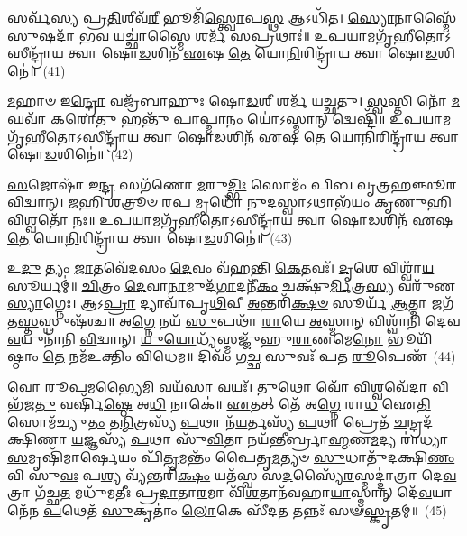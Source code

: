 {\anuvakamend[{𑌅𑌸𑌾᳴𑌵𑌿 \ul{𑌸}\-𑌪𑍍𑌤𑌵𑌿𑍞᳴𑌶𑌤𑌿𑌃}]}%

𑌸𑌰𑍍𑌵᳴𑌸𑍍𑌯 𑌪𑍍𑌰\-\ul{𑌤𑌿}\-𑌶𑍀𑌵᳴\-\ul{𑌰𑍀} 𑌭𑍂𑌮𑌿᳴\-\ul{𑌸𑍍𑌤𑍍𑌵𑍋}\-𑌪\-\ul{𑌸𑍍𑌥} 𑌆\-𑌽𑌧𑌿᳴𑌤। \ul{𑌸𑍍𑌯𑍋}\-𑌨𑌾𑌸𑍍𑌮𑍈᳴ \ul{𑌸𑍁}\-𑌷𑌦𑌾᳴ 𑌭\-\ul{𑌵} 𑌯𑌚𑍍𑌛𑌾॑\-\ul{𑌸𑍍𑌮𑍈} 𑌶𑌰𑍍𑌮᳴ \ul{𑌸}\-𑌪𑍍𑌰𑌥𑌾𑌃॑॥ \ul{𑌉}\-\-\ul{𑌪}\-\-\ul{𑌯𑌾}\-𑌮𑌗𑍃᳴𑌹𑍀\-\ul{𑌤𑍋}\-\-𑌽𑌸𑍀𑌨𑍍𑌦𑍍𑌰𑌾᳴𑌯 𑌤𑍍𑌵𑌾 𑌷𑍋\-\ul{𑌡}\-𑌶𑌿𑌨᳴ \ul{𑌏}\-𑌷 \ul{𑌤𑍇} 𑌯𑍋\-\ul{𑌨𑌿}\-𑌰𑌿𑌨𑍍𑌦𑍍𑌰𑌾᳴𑌯 𑌤𑍍𑌵𑌾 𑌷𑍋\-\ul{𑌡}\-𑌶𑌿𑌨𑍇॑॥~(41)

{\anuvakamend[{𑌸𑌰𑍍𑌵᳴\-\ul{𑌸𑍍𑌯} 𑌷𑌡𑍍𑌵𑌿𑍞᳴𑌶𑌤𑌿𑌃}]}%

\-\ul{𑌮}\-𑌹𑌾𑍞 𑌇\-\ul{𑌨𑍍𑌦𑍍𑌰𑍋} 𑌵𑌜𑍍𑌰᳴𑌬𑌾𑌹𑍁𑌃 𑌷𑍋\-\ul{𑌡}\-𑌶𑍀 𑌶𑌰𑍍𑌮᳴ 𑌯𑌚𑍍𑌛𑌤𑍁। \ul{𑌸𑍍𑌵}\-𑌸𑍍𑌤𑌿 𑌨𑍋᳴ \ul{𑌮}\-𑌘𑌵𑌾᳴ 𑌕𑌰𑍋\-\ul{𑌤𑍁} 𑌹𑌨𑍍𑌤𑍁᳴ \ul{𑌪𑌾}\-𑌪𑍍𑌮𑌾\-\ul{𑌨𑌂} 𑌯𑍋॑\-𑌽𑌸𑍍𑌮𑌾𑌨𑍍 𑌦𑍍𑌵𑍇𑌷𑍍𑌟𑌿᳴॥ \ul{𑌉}\-\-\ul{𑌪}\-\-\ul{𑌯𑌾}\-𑌮𑌗𑍃᳴𑌹𑍀\-\ul{𑌤𑍋}\-\-𑌽𑌸𑍀𑌨𑍍𑌦𑍍𑌰𑌾᳴𑌯 𑌤𑍍𑌵𑌾 𑌷𑍋\-\ul{𑌡}\-𑌶𑌿𑌨᳴ \ul{𑌏}\-𑌷 \ul{𑌤𑍇} 𑌯𑍋\-\ul{𑌨𑌿}\-𑌰𑌿𑌨𑍍𑌦𑍍𑌰𑌾᳴𑌯 𑌤𑍍𑌵𑌾 𑌷𑍋\-\ul{𑌡}\-𑌶𑌿𑌨𑍇॑॥~(42)

{\anuvakamend[{𑌸𑌰𑍍𑌵᳴𑌸𑍍𑌯 \ul{𑌮}\-𑌹𑌾𑌨𑍍𑌥𑍍𑌷𑌡𑍍𑌵𑌿𑍞᳴𑌶\-\ul{𑌤𑌿𑌃} 𑌷𑌡𑍍𑌵𑌿𑍞᳴𑌶𑌤𑌿𑌃}]}%

\-\ul{𑌸}\-𑌜𑍋𑌷𑌾᳴ 𑌇\-\ul{𑌨𑍍𑌦𑍍𑌰} 𑌸𑌗᳴𑌣𑍋 \ul{𑌮}\-𑌰𑍁\-\ul{𑌦𑍍𑌭𑌿𑌃} 𑌸𑍋𑌮𑌂᳴ 𑌪𑌿𑌬 𑌵𑍃𑌤𑍍𑌰𑌹𑌞𑍍𑌛𑍂𑌰 \ul{𑌵𑌿}\-𑌦𑍍𑌵𑌾𑌨𑍍। \ul{𑌜}\-𑌹𑌿 𑌶\-\ul{𑌤𑍍𑌰𑍂}\-\-\ul{𑍞} 𑌰\-\ul{𑌪} 𑌮𑍃𑌧𑍋᳴ 𑌨𑍁\-\ul{𑌦}\-𑌸𑍍𑌵𑌾\-𑌽𑌥𑌾𑌭᳴𑌯𑌂 𑌕𑍃𑌣𑍁𑌹𑌿 \ul{𑌵𑌿}\-𑌶𑍍𑌵𑌤𑍋᳴ 𑌨𑌃॥ \ul{𑌉}\-\-\ul{𑌪}\-\-\ul{𑌯𑌾}\-𑌮𑌗𑍃᳴𑌹𑍀\-\ul{𑌤𑍋}\-\-𑌽𑌸𑍀𑌨𑍍𑌦𑍍𑌰𑌾᳴𑌯 𑌤𑍍𑌵𑌾 𑌷𑍋\-\ul{𑌡}\-𑌶𑌿𑌨᳴ \ul{𑌏}\-𑌷 \ul{𑌤𑍇} 𑌯𑍋\-\ul{𑌨𑌿}\-𑌰𑌿𑌨𑍍𑌦𑍍𑌰𑌾᳴𑌯 𑌤𑍍𑌵𑌾 𑌷𑍋\-\ul{𑌡}\-𑌶𑌿𑌨𑍇॑॥~(43)

{\anuvakamend[{\-\ul{𑌸}\-𑌜𑍋𑌷𑌾॑\-\ul{𑌸𑍍𑌤𑍍𑌰𑌿}\-\-\ul{𑍞}\-𑌶𑌤𑍍}]}%

𑌉\-\ul{𑌦𑍁} 𑌤𑍍𑌯𑌂 \ul{𑌜𑌾}\-𑌤𑌵𑍇᳴𑌦𑌸𑌂 \ul{𑌦𑍇}\-𑌵𑌂 𑌵᳴𑌹𑌨𑍍𑌤𑌿 \ul{𑌕𑍇}\-𑌤𑌵𑌃᳴। \ul{𑌦𑍃}\-𑌶𑍇 𑌵𑌿𑌶𑍍𑌵𑌾᳴\-\ul{𑌯} 𑌸𑍂𑌰𑍍𑌯𑌮𑍍॑॥ \ul{𑌚𑌿}\-𑌤𑍍𑌰𑌂 \ul{𑌦𑍇}\-𑌵𑌾\-\ul{𑌨𑌾}\-𑌮𑍁𑌦᳴\-\ul{𑌗𑌾}\-𑌦𑌨𑍀᳴\-\ul{𑌕𑌂} 𑌚𑌕𑍍𑌷𑍁᳴\-\ul{𑌰𑍍𑌮𑌿}\-𑌤𑍍𑌰\-\ul{𑌸𑍍𑌯} 𑌵𑌰𑍁᳴𑌣\-\ul{𑌸𑍍𑌯𑌾}\-𑌗𑍍𑌨𑍇𑌃। 𑌆\-𑌽\-\ul{𑌪𑍍𑌰𑌾} 𑌦𑍍𑌯𑌾𑌵𑌾᳴𑌪𑍃\-\ul{𑌥𑌿}\-𑌵𑍀 \ul{𑌅}\-𑌨𑍍𑌤𑌰𑌿᳴\-\ul{𑌕𑍍𑌷}\-\-\ul{𑍞} 𑌸𑍂𑌰𑍍𑌯᳴ \ul{𑌆}\-𑌤𑍍𑌮𑌾 𑌜𑌗᳴𑌤\-\ul{𑌸𑍍𑌤}\-𑌸𑍍𑌥𑍁𑌷᳴𑌶𑍍𑌚॥ 𑌅\-\ul{𑌗𑍍𑌨𑍇} 𑌨𑌯᳴ \ul{𑌸𑍁}\-𑌪𑌥𑌾᳴ \ul{𑌰𑌾}\-𑌯𑍇 \ul{𑌅}\-𑌸𑍍𑌮𑌾𑌨𑍍 𑌵𑌿𑌶𑍍𑌵𑌾᳴𑌨𑌿 𑌦𑍇𑌵 \ul{𑌵}\-𑌯𑍁𑌨𑌾᳴𑌨𑌿 \ul{𑌵𑌿}\-𑌦𑍍𑌵𑌾𑌨𑍍। \ul{𑌯𑍁}\-\-\ul{𑌯𑍋}\-𑌧𑍍𑌯᳴𑌸𑍍𑌮𑌜𑍍𑌜𑍁᳴𑌹𑍁\-\ul{𑌰𑌾}\-𑌣𑌮𑍇\-\ul{𑌨𑍋} 𑌭𑍂𑌯𑌿᳴𑌷𑍍𑌠𑌾𑌂 \ul{𑌤𑍇} 𑌨𑌮᳴𑌉𑌕𑍍𑌤𑌿𑌂 𑌵𑌿𑌧𑍇𑌮॥ 𑌦𑌿𑌵𑌂᳴ 𑌗\-\ul{𑌚𑍍𑌛} 𑌸𑍁𑌵𑌃᳴ 𑌪𑌤 \ul{𑌰𑍂}\-𑌪𑍇𑌣᳴~(44)

𑌵𑍋 \ul{𑌰𑍂}\-𑌪\-\ul{𑌮}\-𑌭𑍍𑌯𑍈\-\ul{𑌮𑌿} 𑌵𑌯᳴\-\ul{𑌸𑌾} 𑌵𑌯𑌃᳴। \ul{𑌤𑍁}\-𑌥𑍋 𑌵𑍋᳴ \ul{𑌵𑌿}\-𑌶𑍍𑌵𑌵𑍇᳴\-\ul{𑌦𑌾} 𑌵𑌿 𑌭᳴𑌜\-\ul{𑌤𑍁} 𑌵𑌰𑍍\mbox{}𑌷𑌿᳴\-\ul{𑌷𑍍𑌠𑍇} 𑌅\-\ul{𑌧𑌿} 𑌨𑌾𑌕𑍇॑॥ \ul{𑌏}\-𑌤𑌤𑍍 𑌤𑍇᳴ 𑌅\-\ul{𑌗𑍍𑌨𑍇} 𑌰𑌾\-\ul{𑌧} 𑌐\-\ul{𑌤𑌿} 𑌸𑍋𑌮᳴𑌚𑍍𑌯𑍁\-\ul{𑌤𑌂} 𑌤\-\ul{𑌨𑍍𑌮𑌿}\-𑌤𑍍𑌰𑌸𑍍𑌯᳴ \ul{𑌪}\-𑌥𑌾 𑌨᳴\-\ul{𑌯}\-𑌰𑍍𑌤𑌸𑍍𑌯᳴ \ul{𑌪}\-𑌥𑌾 𑌪𑍍𑌰𑍇𑌤᳴ \ul{𑌚}\-𑌨𑍍𑌦𑍍𑌰𑌦᳴𑌕𑍍𑌷𑌿𑌣𑌾 \ul{𑌯}\-𑌜𑍍𑌞𑌸𑍍𑌯᳴ \ul{𑌪}\-𑌥𑌾 𑌸𑍁᳴\-\ul{𑌵𑌿}\-𑌤𑌾 𑌨𑌯᳴𑌨𑍍𑌤𑍀𑌰𑍍𑌬𑍍𑌰𑌾\-\ul{𑌹𑍍𑌮}\-𑌣\-\ul{𑌮}\-𑌦𑍍𑌯 𑌰𑌾॑𑌧𑍍𑌯𑌾\-\ul{𑌸}\-𑌮𑍃𑌷𑌿᳴𑌮𑌾𑌰𑍍\mbox{}\-\ul{𑌷𑍇}\-𑌯𑌂 𑌪𑌿᳴\-\ul{𑌤𑍃}\-𑌮𑌨𑍍𑌤𑌂᳴ 𑌪𑍈𑌤𑍃\-\ul{𑌮}\-𑌤𑍍𑌯𑍞 \ul{𑌸𑍁}\-𑌧𑌾𑌤𑍁᳴𑌦𑌕𑍍𑌷𑌿\-\ul{𑌣𑌂} 𑌵𑌿 𑌸𑍁\-\ul{𑌵𑌃} 𑌪\-\ul{𑌶𑍍𑌯} 𑌵𑍍𑌯᳴𑌨𑍍𑌤𑌰𑌿᳴\-\ul{𑌕𑍍𑌷𑌂} 𑌯𑌤᳴𑌸𑍍𑌵 𑌸\-\ul{𑌦}\-𑌸𑍍𑌯𑍈᳴\-\ul{𑌰}\-𑌸𑍍𑌮𑌦𑍍𑌦𑌾॑𑌤𑍍𑌰𑌾 𑌦𑍇\-\ul{𑌵}\-𑌤𑍍𑌰𑌾 𑌗᳴𑌚𑍍𑌛\-\ul{𑌤} 𑌮𑌧𑍁᳴𑌮𑌤𑍀𑌃 𑌪𑍍𑌰\-\ul{𑌦𑌾}\-𑌤𑌾\-\ul{𑌰}\-𑌮𑌾 𑌵𑌿᳴\-\ul{𑌶}\-𑌤𑌾𑌨᳴𑌵𑌹𑌾\-\ul{𑌯𑌾}\-𑌸𑍍𑌮𑌾𑌨𑍍 𑌦𑍇᳴\-\ul{𑌵}\-𑌯𑌾𑌨𑍇᳴𑌨 \ul{𑌪}\-𑌥𑍇𑌤᳴ \ul{𑌸𑍁}\-𑌕𑍃𑌤𑌾𑌂॑ \ul{𑌲𑍋}\-𑌕𑍇 𑌸𑍀᳴𑌦\-\ul{𑌤} 𑌤𑌨𑍍𑌨𑌃᳴ 𑌸𑍟\-\ul{𑌸𑍍𑌕𑍃}\-𑌤𑌮𑍍॥~(45)

